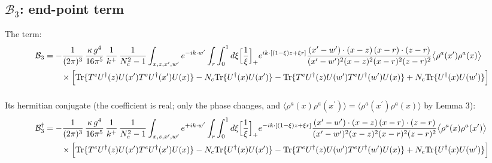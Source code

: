 \documentclass[10pt]{article}
\begin{document}
\subsection*{$\mathcal{B}_{3}$: end-point term}
\noindent The term:
\begin{align}
\mathcal{B}_{3}&=-\frac{1}{(2\pi)^{3}}\,\frac{\kappa\,g^{4}}{16\pi^{5}}\,\frac{1}{k^{+}}\,\frac{1}{N_{c}^{2}-1}\int_{x,z,x',w'}e^{-ik\cdot w'}\int_{r}\int_{0}^{1}d\xi\Big[\frac1\xi\Big]_{+}e^{ik\cdot[(1-\xi)z+\xi r]}\frac{(x'-w')\cdot(x-z)\,(x-r)\cdot(z-r)}{(x'-w')^{2}(x-z)^{2}(x-r)^{2}(z-r)^{2}}\big\langle\rho^{a}(x')\rho^{a}(x)\big\rangle\notag\\
&\qquad\times\Big[{\rm Tr}\{T^{e}U^{\dagger}(z)U(x')T^{e}U^{\dagger}(x')U(x)\}-N_{c}{\rm Tr}\{U^{\dagger}(x)U(x')\}-{\rm Tr}\{T^{e}U^{\dagger}(z)U(w')T^{e}U^{\dagger}(w')U(x)\}+N_{c}{\rm Tr}\{U^{\dagger}(x)U(w')\}\Big]\notag\\[6pt]
\end{align}

\noindent Its hermitian conjugate (the coefficient is real; only the phase changes, and $\langle\rho^{a}(x)\rho^{a}(x^{\prime})\rangle=\langle\rho^{a}(x^{\prime})\rho^{a}(x)\rangle$ by Lemma 3):
\begin{align}
\mathcal{B}_{3}^{\dagger}&=-\frac{1}{(2\pi)^{3}}\,\frac{\kappa\,g^{4}}{16\pi^{5}}\,\frac{1}{k^{+}}\,\frac{1}{N_{c}^{2}-1}\int_{x,z,x',w'}e^{+ik\cdot w'}\int_{r}\int_{0}^{1}d\xi\Big[\frac1\xi\Big]_{+}e^{-ik\cdot[(1-\xi)z+\xi r]}\frac{(x'-w')\cdot(x-z)\,(x-r)\cdot(z-r)}{(x'-w')^{2}(x-z)^{2}(x-r)^{2}(z-r)^{2}}\big\langle\rho^{a}(x)\rho^{a}(x')\big\rangle\notag\\
&\qquad\times\Big[{\rm Tr}\{T^{e}U^{\dagger}(z)U(x')T^{e}U^{\dagger}(x')U(x)\}-N_{c}{\rm Tr}\{U^{\dagger}(x)U(x')\}-{\rm Tr}\{T^{e}U^{\dagger}(z)U(w')T^{e}U^{\dagger}(w')U(x)\}+N_{c}{\rm Tr}\{U^{\dagger}(x)U(w')\}\Big]\notag\\[6pt]
\end{align}
\end{document}
